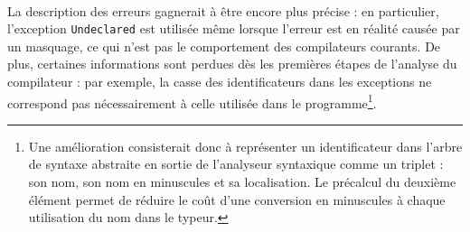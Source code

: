 \documentclass[a4paper,12pt]{article}
\begin{document}
\paragraph*{}
La description des erreurs gagnerait à être encore plus précise : en particulier, l'exception \texttt{Undeclared} est utilisée même lorsque l'erreur est en réalité causée par un masquage, ce qui n'est pas le comportement des compilateurs courants. De plus, certaines informations sont perdues dès les premières étapes de l'analyse du compilateur : par exemple, la casse des identificateurs dans les exceptions ne correspond pas nécessairement à celle utilisée dans le programme\footnote{Une amélioration consisterait donc à représenter un identificateur dans l'arbre de syntaxe abstraite en sortie de l'analyseur syntaxique comme un triplet : son nom, son nom en minuscules et sa localisation. Le précalcul du deuxième élément permet de réduire le coût d'une conversion en minuscules à chaque utilisation du nom dans le typeur.}.
\end{document}
